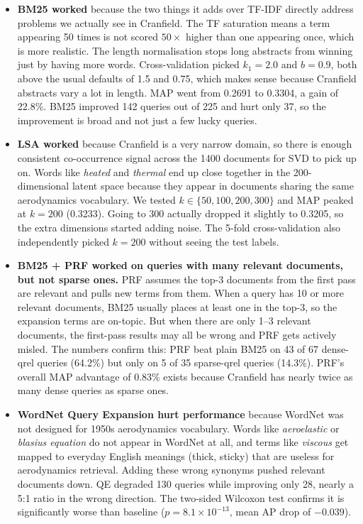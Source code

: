\documentclass{svproc}
\begin{document}
    \begin{itemize}

    \item \textbf{BM25 worked} because the two things it adds over TF-IDF directly address problems we actually see in Cranfield. The TF saturation means a term appearing 50 times is not scored $50\times$ higher than one appearing once, which is more realistic. The length normalisation stops long abstracts from winning just by having more words. Cross-validation picked $k_1{=}2.0$ and $b{=}0.9$, both above the usual defaults of 1.5 and 0.75, which makes sense because Cranfield abstracts vary a lot in length. MAP went from 0.2691 to 0.3304, a gain of 22.8\%. BM25 improved 142 queries out of 225 and hurt only 37, so the improvement is broad and not just a few lucky queries.

    \item \textbf{LSA worked} because Cranfield is a very narrow domain, so there is enough consistent co-occurrence signal across the 1400 documents for SVD to pick up on. Words like \textit{heated} and \textit{thermal} end up close together in the 200-dimensional latent space because they appear in documents sharing the same aerodynamics vocabulary. We tested $k \in \{50, 100, 200, 300\}$ and MAP peaked at $k{=}200$ (0.3233). Going to 300 actually dropped it slightly to 0.3205, so the extra dimensions started adding noise. The 5-fold cross-validation also independently picked $k{=}200$ without seeing the test labels.

    \item \textbf{BM25 + PRF worked on queries with many relevant documents, but not sparse ones.} PRF assumes the top-3 documents from the first pass are relevant and pulls new terms from them. When a query has 10 or more relevant documents, BM25 usually places at least one in the top-3, so the expansion terms are on-topic. But when there are only 1--3 relevant documents, the first-pass results may all be wrong and PRF gets actively misled. The numbers confirm this: PRF beat plain BM25 on 43 of 67 dense-qrel queries (64.2\%) but only on 5 of 35 sparse-qrel queries (14.3\%). PRF's overall MAP advantage of 0.83\% exists because Cranfield has nearly twice as many dense queries as sparse ones.

    \item \textbf{WordNet Query Expansion hurt performance} because WordNet was not designed for 1950s aerodynamics vocabulary. Words like \textit{aeroelastic} or \textit{blasius equation} do not appear in WordNet at all, and terms like \textit{viscous} get mapped to everyday English meanings (thick, sticky) that are useless for aerodynamics retrieval. Adding these wrong synonyms pushed relevant documents down. QE degraded 130 queries while improving only 28, nearly a 5:1 ratio in the wrong direction. The two-sided Wilcoxon test confirms it is significantly worse than baseline ($p = 8.1 \times 10^{-13}$, mean AP drop of $-0.039$).


\end{itemize}
\end{document}
